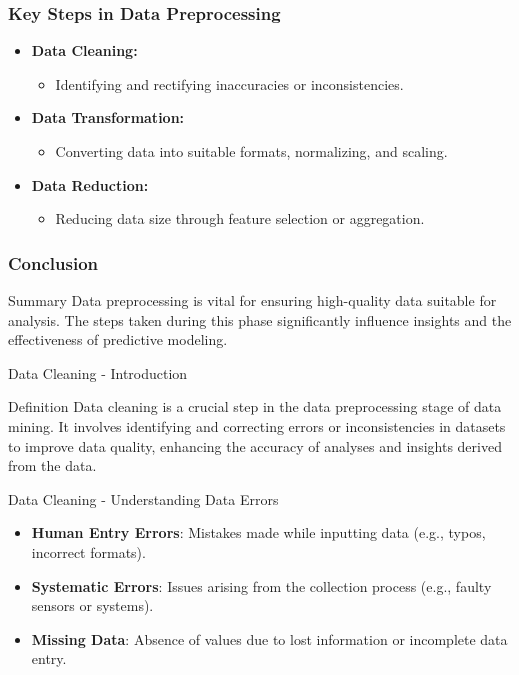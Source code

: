 \documentclass[aspectratio=169]{beamer}
\begin{document}
\begin{frame}[fragile]
    \frametitle{Key Steps in Data Preprocessing}
    \begin{itemize}
        \item \textbf{Data Cleaning:} 
        \begin{itemize}
            \item Identifying and rectifying inaccuracies or inconsistencies.
        \end{itemize}
        
        \item \textbf{Data Transformation:}
        \begin{itemize}
            \item Converting data into suitable formats, normalizing, and scaling.
        \end{itemize}
        
        \item \textbf{Data Reduction:}
        \begin{itemize}
            \item Reducing data size through feature selection or aggregation.
        \end{itemize}
    \end{itemize}
\end{frame}

\begin{frame}[fragile]
    \frametitle{Conclusion}
    \begin{block}{Summary}
        Data preprocessing is vital for ensuring high-quality data suitable for analysis. 
        The steps taken during this phase significantly influence insights and the effectiveness of predictive modeling.
    \end{block}
\end{frame}

\begin{frame}[fragile]{Data Cleaning - Introduction}
    \begin{block}{Definition}
        Data cleaning is a crucial step in the data preprocessing stage of data mining. It involves identifying and correcting errors or inconsistencies in datasets to improve data quality, enhancing the accuracy of analyses and insights derived from the data.
    \end{block}
\end{frame}

\begin{frame}[fragile]{Data Cleaning - Understanding Data Errors}
    \begin{itemize}
        \item \textbf{Human Entry Errors}: Mistakes made while inputting data (e.g., typos, incorrect formats).
        \item \textbf{Systematic Errors}: Issues arising from the collection process (e.g., faulty sensors or systems).
        \item \textbf{Missing Data}: Absence of values due to lost information or incomplete data entry.
    \end{itemize}
\end{frame}
\end{document}
